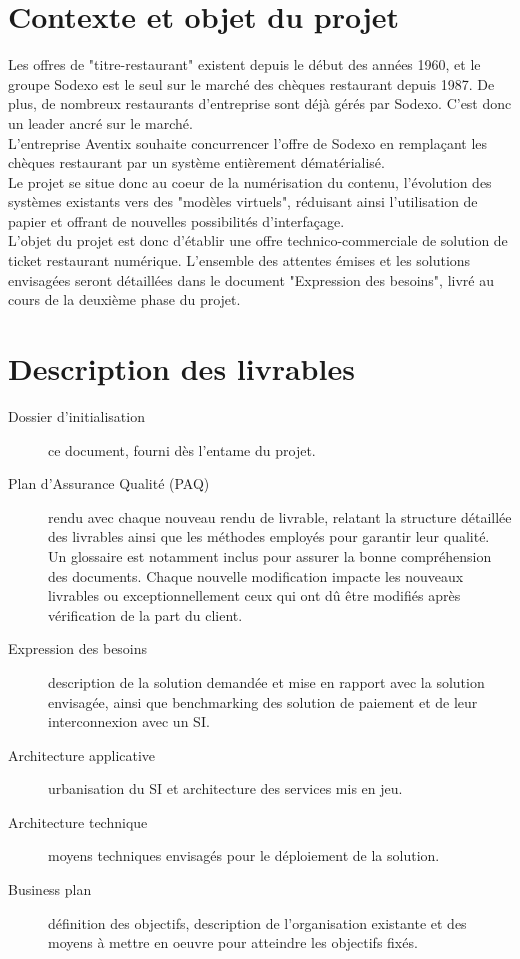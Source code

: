 
\usepackage{lscape}
\usepackage{wrapfig}
\usepackage{float}



\section{Contexte et objet du projet}

Les offres de "titre-restaurant" existent depuis le début des années 1960, et
le groupe Sodexo est le seul sur le marché des chèques restaurant depuis 1987.
De plus, de nombreux restaurants d'entreprise sont déjà gérés par Sodexo. C'est
donc un leader ancré sur le marché. \\

L'entreprise Aventix souhaite concurrencer l'offre de Sodexo en remplaçant les
chèques restaurant par un système entièrement dématérialisé. \\

Le projet se situe donc au coeur de la numérisation du contenu, l'évolution des
systèmes existants vers des "modèles virtuels", réduisant ainsi l'utilisation
de papier et offrant de nouvelles possibilités d'interfaçage. \\

L'objet du projet est donc d'établir une offre technico-commerciale de solution
de ticket restaurant numérique. L'ensemble des attentes émises et les solutions
envisagées seront détaillées dans le document "Expression des besoins", livré
au cours de la deuxième phase du projet.

\section{Description des livrables}
\begin{description}
    \item[Dossier d'initialisation] ce document, fourni dès l'entame du projet.
    \item[Plan d'Assurance Qualité (PAQ)] rendu avec chaque nouveau rendu de
        livrable, relatant la structure détaillée des livrables ainsi que les
        méthodes employés pour garantir leur qualité. Un glossaire est
        notamment inclus pour assurer la bonne compréhension des documents.
        Chaque nouvelle modification impacte les nouveaux livrables ou
        exceptionnellement ceux qui ont dû être modifiés après vérification de
        la part du client.
    \item[Expression des besoins] description de la solution demandée et mise en
        rapport avec la solution envisagée, ainsi que benchmarking des solution
        de paiement et de leur interconnexion avec un SI.
    \item[Architecture applicative] urbanisation du SI et architecture des services mis en jeu.
    \item[Architecture technique] moyens techniques envisagés pour le déploiement de la solution.
    \item[Business plan] définition des objectifs, description de l'organisation
        existante et des moyens à mettre en oeuvre pour atteindre les objectifs
        fixés.
\end{description}

